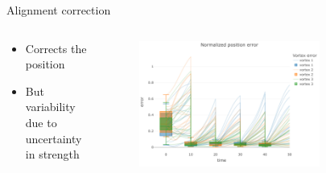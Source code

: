 \documentclass[aspectratio=169]{beamer} %
\begin{document}
\begin{frame}{Alignment correction}
    \vspace{-0.5cm}
    \begin{columns}
        \begin{column}{0.5\textwidth}
            \begin{itemize}
                \item Corrects the position
                \item But variability due to uncertainty in strength
            \end{itemize}

            \begin{figure}
                \centering
            \end{figure}
        \end{column}
        \begin{column}{0.5\textwidth}
            \begin{figure}

                \centering
                \includegraphics[width=0.75\textwidth]{images/error_position_w_assim.pdf}
            \end{figure}
        \end{column}
    \end{columns}
\end{frame}
\end{document}
